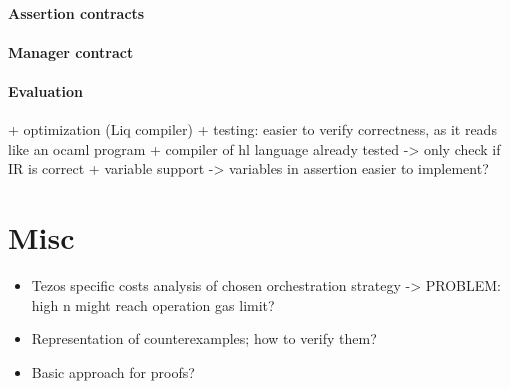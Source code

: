\paragraph{Assertion contracts}


\paragraph{Manager contract}




\paragraph{Evaluation}
+ optimization (Liq compiler)
+ testing: easier to verify correctness, as it reads like an ocaml program
	+ compiler of hl language already tested -> only check if IR is correct
+ variable support -> variables in assertion easier to implement?


\section{Misc}
\begin{itemize}
\item Tezos specific costs analysis of chosen orchestration strategy -> PROBLEM: high n might reach operation gas limit?
\item Representation of counterexamples; how to verify them?
\item Basic approach for proofs?
\end{itemize} 